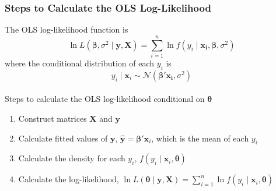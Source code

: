\documentclass{beamer}\usepackage[]{graphicx}\usepackage[]{color}
\begin{document}
\begin{frame}\frametitle{Steps to Calculate the OLS Log-Likelihood}
    The OLS log-likelihood function is
    $$\ln L(\bm{\beta}, \sigma^2 \mid \bm{y}, \bm{X}) = \sum_{i = 1}^n \ln f(y_i \mid \bm{x_i}, \bm{\beta}, \sigma^2)$$
    where the conditional distribution of each $y_i$ is
    $$y_i \mid \bm{x}_i \sim \mathcal{N}(\bm{\beta}' \bm{x_i}, \sigma^2)$$ \\
    \vspace{2ex}
    Steps to calculate the OLS log-likelihood conditional on $\bm{\theta}$
    \begin{enumerate}
        \item Construct matrices $\bm{X}$ and $\bm{y}$
        \item Calculate fitted values of $\bm{y}$, $\widehat{\bm{y}} = \bm{\beta}' \bm{x}_i$, which is the mean of each $y_i$
        \item Calculate the density for each $y_i$, $f(y_i \mid \bm{x}_i, \bm{\theta})$
        \item Calculate the log-likelihood, $\ln L(\bm{\theta} \mid \bm{y}, \bm{X}) = \sum_{i = 1}^n \ln f(y_i \mid \bm{x}_i, \bm{\theta})$
    \end{enumerate}
\end{frame}
\end{document}
